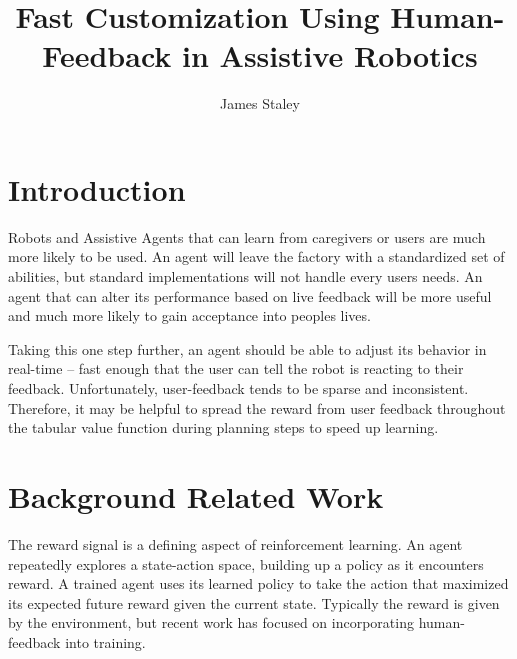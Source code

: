 \documentclass{article}
\title{Fast Customization Using Human-Feedback in Assistive Robotics}
\author{James Staley}
\date{\vspace{-1em}}
\begin{document}
\maketitle


\section{Introduction}

Robots and Assistive Agents that can learn from caregivers or users are much more likely to be used. An agent will leave the factory with a standardized set of abilities, but standard implementations will not handle every users needs. An agent that can alter its performance based on live feedback will be more useful and much more likely to gain acceptance into peoples lives. 

Taking this one step further, an agent should be able to adjust its behavior in real-time -- fast enough that the user can tell the robot is reacting to their feedback. Unfortunately, user-feedback tends to be sparse and inconsistent. Therefore, it may be helpful to spread the reward from user feedback throughout the tabular value function during planning steps to speed up learning. 



\section{Background Related Work}

The reward signal is a defining aspect of reinforcement learning. An agent repeatedly explores a state-action space, building up a policy as it encounters reward. A trained agent uses its learned policy to take the action that maximized its expected future reward given the current state. Typically the reward is given by the environment, but recent work has focused on incorporating human-feedback into training. 
\end{document}
